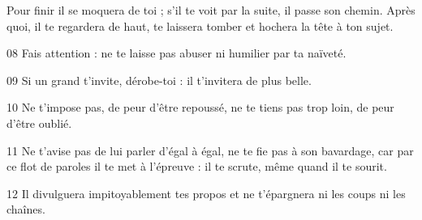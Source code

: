 Pour finir il se moquera de toi ; s’il te voit par la suite, il passe son chemin. Après quoi, il te regardera de haut, te laissera tomber et hochera la tête à ton sujet.

08 Fais attention : ne te laisse pas abuser ni humilier par ta naïveté.

09 Si un grand t’invite, dérobe-toi : il t’invitera de plus belle.

10 Ne t’impose pas, de peur d’être repoussé, ne te tiens pas trop loin, de peur d’être oublié.

11 Ne t’avise pas de lui parler d’égal à égal, ne te fie pas à son bavardage, car par ce flot de paroles il te met à l’épreuve : il te scrute, même quand il te sourit.

12 Il divulguera impitoyablement tes propos et ne t’épargnera ni les coups ni les chaînes.
